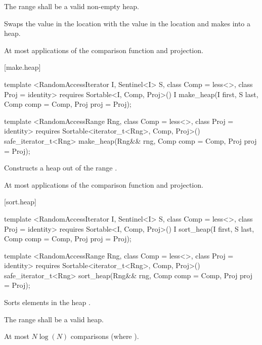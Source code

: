 \begin{itemdescr}
\pnum
\requires
The range
shall be a valid non-empty heap.

\pnum
\effects
Swaps the value in the location 
with the value in the location
and makes
into a heap.

\pnum
\returns {}

\pnum
\complexity
At most
applications of the comparison function and projection.
\end{itemdescr}

[make.heap]{}

%
\begin{itemdecl}
template <RandomAccessIterator I, Sentinel<I> S, class Comp = less<>,
    class Proj = identity>
  requires Sortable<I, Comp, Proj>()
  I make_heap(I first, S last, Comp comp = Comp{}, Proj proj = Proj{});

template <RandomAccessRange Rng, class Comp = less<>, class Proj = identity>
  requires Sortable<iterator_t<Rng>, Comp, Proj>()
  safe_iterator_t<Rng>
    make_heap(Rng&& rng, Comp comp = Comp{}, Proj proj = Proj{});
\end{itemdecl}

\begin{itemdescr}
\pnum
\effects
Constructs a heap out of the range
.

\pnum
\returns {}

\pnum
\complexity
At most
applications of the comparison function and projection.
\end{itemdescr}

[sort.heap]{}

%
\begin{itemdecl}
template <RandomAccessIterator I, Sentinel<I> S, class Comp = less<>,
    class Proj = identity>
  requires Sortable<I, Comp, Proj>()
  I sort_heap(I first, S last, Comp comp = Comp{}, Proj proj = Proj{});

template <RandomAccessRange Rng, class Comp = less<>, class Proj = identity>
  requires Sortable<iterator_t<Rng>, Comp, Proj>()
  safe_iterator_t<Rng>
    sort_heap(Rng&& rng, Comp comp = Comp{}, Proj proj = Proj{});
\end{itemdecl}

\begin{itemdescr}
\pnum
\effects
Sorts elements in the heap
.

\pnum
\requires The range  shall be a valid heap.

\pnum
\returns {}

\pnum
\complexity
At most $N \log(N)$
comparisons (where
).
\end{itemdescr}

